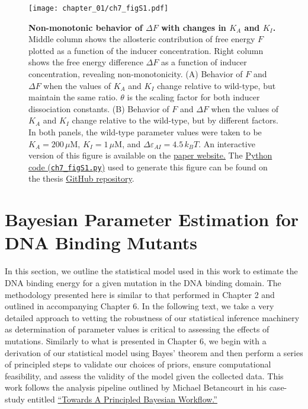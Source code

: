 \documentclass[12pt]{caltech_thesis}
\begin{document}
\hypertarget{fig:nonmono}{%
\begin{figure}
\centering
\texttt{[image: chapter\_01/ch7\_figS1.pdf]}
\caption[{Non-monotonic behavior of \(\Delta F\) with changes in \(K_A\)
and \(K_I\).}]{\textbf{Non-monotonic behavior of \(\Delta F\) with
changes in \(K_A\) and \(K_I\).} Middle column shows the allosteric
contribution of free energy \(F\) plotted as a function of the inducer
concentration. Right column shows the free energy difference
\(\Delta F\) as a function of inducer concentration, revealing
non-monotonicity. (A) Behavior of \(F\) and \(\Delta F\) when the values
of \(K_A\) and \(K_I\) change relative to wild-type, but maintain the
same ratio. \(\theta\) is the scaling factor for both inducer
dissociation constants. (B) Behavior of \(F\) and \(\Delta F\) when the
values of \(K_A\) and \(K_I\) change relative to the wild-type, but by
different factors. In both panels, the wild-type parameter values were
taken to be \(K_A = 200\,\mu\)M, \(K_I = 1\,\mu\)M, and
\(\Delta\varepsilon_{AI} = 4.5\,k_BT\). An interactive version of this
figure is available on the
\href{http://rpgroup.caltech.edu/mwc_mutants}{paper website.} The
\href{https://github.com/gchure/phd/blob/master/src/chapter_07/code/ch7_figS1.py}{Python
code (\texttt{ch7\_figS1.py})} used to generate this figure can be found
on the thesis \href{https://github.com/gchure/phd}{GitHub repository}.}
\label{fig:nonmono}
\end{figure}
}

\hypertarget{bayesian-parameter-estimation-for-dna-binding-mutants}{%
\section{Bayesian Parameter Estimation for DNA Binding
Mutants}\label{bayesian-parameter-estimation-for-dna-binding-mutants}}

In this section, we outline the statistical model used in this work to
estimate the DNA binding energy for a given mutation in the DNA binding
domain. The methodology presented here is similar to that performed in
Chapter 2 and outlined in accompanying Chapter 6. In the following text,
we take a very detailed approach to vetting the robustness of our
statistical inference machinery as determination of parameter values is
critical to assessing the effects of mutations. Similarly to what is
presented in Chapter 6, we begin with a derivation of our statistical
model using Bayes' theorem and then perform a series of principled steps
to validate our choices of priors, ensure computational feasibility, and
assess the validity of the model given the collected data. This work
follows the analysis pipeline outlined by Michael Betancourt in his
case-study entitled
\href{https://betanalpha.github.io/assets/case_studies/principled_bayesian_workflow.html}{``Towards
A Principled Bayesian Workflow.''}
\end{document}
